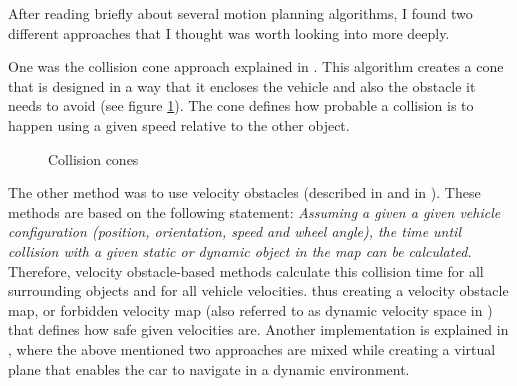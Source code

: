 After reading briefly about several motion planning algorithms, I found two different approaches that I thought was worth looking into more deeply.

One was the collision cone approach explained in \cite{CollisionCone}. This algorithm creates a cone that is designed in a way that it encloses the vehicle and also the obstacle it needs to avoid (see figure \ref{collision_cones}). The cone defines how probable a collision is to happen using a given speed relative to the other object.

\begin{figure}[!ht]
	\centering
	\caption{Collision cones}
	\label{collision_cones}
\end{figure}

The other method was to use velocity obstacles (described in \cite{VelocityForbiddenMap} and in \cite{VelocityObstacles}). These methods are based on the following statement: \textit{Assuming a given a given vehicle configuration (position, orientation, speed and wheel angle), the time until collision with a given static or dynamic object in the map can be calculated.} Therefore, velocity obstacle-based methods calculate this collision time for all surrounding objects and for all vehicle velocities. thus creating a velocity obstacle map, or forbidden velocity map (also referred to as dynamic velocity space in \cite{DynamicMotionPlanningSurvey}) that defines how safe given velocities are. Another implementation is explained in \cite{ReactivePathPlanning}, where the above mentioned two approaches are mixed while creating a virtual plane that enables the car to navigate in a dynamic environment.

